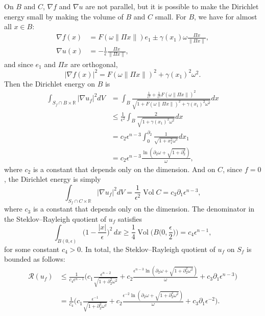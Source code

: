 \documentclass{GEM-JNL-FMP}
\theoremstyle{definition}
\numberwithin{equation}{section}
\begin{document}
On $B$ and $C$, $\nabla f$ and $\nabla u$ are not parallel, but
it is possible to make the Dirichlet energy small by making
the volume of $B$ and $C$ small.
For $B$, we have for almost all $x \in B$:
\begin{align}\label{eq:nablafonB}
  \nabla f(x) &= F(\omega \|\Pi x\|) e_1 \pm \gamma(x_1) \omega
                \frac{\Pi x}{\|\Pi x\|}, \\
  \nabla u(x) &= -\frac{1}{\epsilon} \frac{\Pi x}{\|\Pi x\|},
\end{align}
and since $e_1$ and $\Pi x$ are orthogonal,
\begin{equation*}
  |\nabla f(x)|^2 = F(\omega \|\Pi x\|)^2 + \gamma(x_1)^2 \omega^2.
\end{equation*}
Then the Dirichlet energy on $B$ is
\begin{align*}
  \int_{S_f \cap B \times \mathbb{R}} |\nabla u_f|^2 dV
  &= \int_B \frac{\frac{1}{\epsilon^2} + \frac{1}{\epsilon^2}
    F(\omega \|\Pi x\|)^2}
    {\sqrt{1 + F(\omega \|\Pi x\|)^2 + \gamma(x_1)^2 \omega^2}}
    dx\\
  &\leq \frac{1}{\epsilon^2}
    \int_B \frac{2}{\sqrt{1 + \gamma(x_1)^2 \omega^2}} dx \\
  &= c_2 \epsilon^{n-3}
    \int_0^{\partial_2} \frac{1}{\sqrt{1 + x_1^2 \omega^2}} dx_1 \\
  &= c_2 \epsilon^{n-3}
    \frac{\ln(\partial_2 \omega + \sqrt{1 + \partial_2^2})}{\omega},
\end{align*}
where $c_2$ is a constant that depends only on the dimension.
And on $C$, since $f=0$, the Dirichlet energy is simply
\begin{equation*}
  \int_{S_f \cap C \times \mathbb{R}} |\nabla u_f|^2 dV = \frac{1}{\epsilon^2} \mathop{\mbox{Vol}} C
  = c_3 \partial_1 \epsilon^{n-3},
\end{equation*}
where $c_3$ is a constant that depends only on the dimension.
The denominator in the Steklov--Rayleigh quotient of $u_f$ satisfies
 $$\int_{B(0,\epsilon)}\Big(1-\frac{|x|}{\epsilon}\Big)^2\,dx\geq\frac{1}{4}\mathop{\mbox{Vol}}
 \Big({B\Big(0,\frac{\epsilon}{2}\Big)}\Big)=c_4\epsilon^{n-1},$$
for some constant $c_4>0$.
In total, the Steklov--Rayleigh quotient of $u_f$ on $S_f$ is bounded as follows:
\begin{align*}
  \mathcal{R}(u_f)
  &\leq \frac{1}{c_4\epsilon^{n-1}}
    \Big(c_1 \frac{\epsilon^{n-2}}{\sqrt{1 + \partial_2^2 \omega^2}}
    + c_2 \frac{\epsilon^{n-3} \ln(\partial_2 \omega +
    \sqrt{1 + \partial_2^2 \omega^2})}{\omega}
    + c_3 \partial_1 \epsilon^{n-3} \Big)\\
  &= \frac{1}{c_4}\Big(c_1 \frac{\epsilon^{-1}}{\sqrt{1 + \partial_2^2 \omega^2}}
    + c_2 \frac{\epsilon^{-2} \ln(\partial_2 \omega + \sqrt{1 +
    \partial_2^2 \omega^2})}{\omega}
    + c_3 \partial_1 \epsilon^{-2}\Big).
\end{align*}
\end{document}
